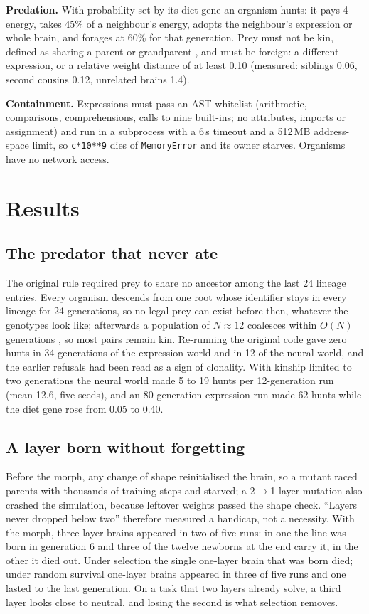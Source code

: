 \documentclass[10pt,twocolumn]{article}
\begin{document}
\textbf{Predation.} With probability set by its diet gene an organism hunts:
it pays 4 energy, takes 45\% of a neighbour's energy, adopts the neighbour's
expression or whole brain, and forages at 60\% for that generation. Prey must
not be kin, defined as sharing a parent or grandparent \cite{hamilton}, and
must be foreign: a different expression, or a relative weight distance of at
least 0.10 (measured: siblings 0.06, second cousins 0.12, unrelated brains
1.4).

\textbf{Containment.} Expressions must pass an AST whitelist (arithmetic,
comparisons, comprehensions, calls to nine built-ins; no attributes, imports
or assignment) and run in a subprocess with a 6\,s timeout and a 512\,MB
address-space limit, so \texttt{c*10**9} dies of \texttt{MemoryError} and its
owner starves. Organisms have no network access.

\section{Results}\label{sec:results}
\subsection{The predator that never ate}
The original rule required prey to share no ancestor among the last 24 lineage
entries. Every organism descends from one root whose identifier stays in every
lineage for 24 generations, so no legal prey can exist before then, whatever
the genotypes look like; afterwards a population of $N\approx12$ coalesces
within $O(N)$ generations \cite{kingman}, so most pairs remain kin. Re-running
the original code gave zero hunts in 34 generations of the expression world
and in 12 of the neural world, and the earlier refusals had been read as a
sign of clonality. With kinship limited to two generations the neural world
made 5 to 19 hunts per 12-generation run (mean 12.6, five seeds), and an
80-generation expression run made 62 hunts while the diet gene rose from 0.05
to 0.40.

\subsection{A layer born without forgetting}
Before the morph, any change of shape reinitialised the brain, so a mutant
raced parents with thousands of training steps and starved; a 2$\to$1 layer
mutation also crashed the simulation, because leftover weights passed the
shape check. ``Layers never dropped below two'' therefore measured a handicap,
not a necessity. With the morph, three-layer brains appeared in two of five
runs: in one the line was born in generation 6 and three of the twelve
newborns at the end carry it, in the other it died out. Under selection the
single one-layer brain that was born died; under random survival one-layer
brains appeared in three of five runs and one lasted to the last
generation. On a task that two layers already solve, a third layer looks close
to neutral, and losing the second is what selection removes.
\end{document}
